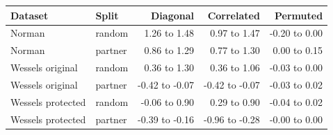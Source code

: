 \begin{tabular}{llrrr}\toprule
Dataset & Split & Diagonal & Correlated & Permuted \\ \midrule
Norman & random & 1.26 to 1.48 & 0.97 to 1.47 & -0.20 to 0.00 \\
Norman & partner & 0.86 to 1.29 & 0.77 to 1.30 & 0.00 to 0.15 \\
Wessels original & random & 0.36 to 1.30 & 0.36 to 1.06 & -0.03 to 0.00 \\
Wessels original & partner & -0.42 to -0.07 & -0.42 to -0.07 & -0.03 to 0.02 \\
Wessels protected & random & -0.06 to 0.90 & 0.29 to 0.90 & -0.04 to 0.02 \\
Wessels protected & partner & -0.39 to -0.16 & -0.96 to -0.28 & -0.00 to 0.00 \\
\bottomrule\end{tabular}
